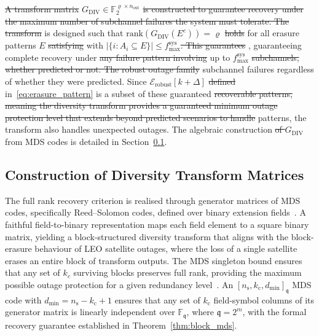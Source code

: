 \documentclass[lettersize,journal]{IEEEtran}
\providecommand{\DIFadd}[1]{{\protect\color{blue}#1}} %
\providecommand{\DIFdel}[1]{{\protect\color{red}\sout{#1}}}                      %
\providecommand{\DIFaddbegin}{} %
\providecommand{\DIFaddend}{} %
\providecommand{\DIFdelbegin}{} %
\providecommand{\DIFdelend}{} %
\newcommand{\DIFscaledelfig}{0.5}
\newlength{\DIFdelgraphicswidth} %
\newlength{\DIFdelgraphicsheight} %
\newcommand{\DIFaddincludegraphics}[2][]{{\color{blue}\fbox{\DIFOincludegraphics[#1]{#2}}}} %
\newcommand{\DIFdelincludegraphics}[2][]{%
\sbox{\DIFdelgraphicsbox}{\DIFOincludegraphics[#1]{#2}}%
\settoboxwidth{\DIFdelgraphicswidth}{\DIFdelgraphicsbox} %
\settoboxtotalheight{\DIFdelgraphicsheight}{\DIFdelgraphicsbox} %
\scalebox{\DIFscaledelfig}{%
\parbox[b]{\DIFdelgraphicswidth}{\usebox{\DIFdelgraphicsbox}\\[-\baselineskip] \rule{\DIFdelgraphicswidth}{0em}}\llap{\resizebox{\DIFdelgraphicswidth}{\DIFdelgraphicsheight}{%
\setlength{\unitlength}{\DIFdelgraphicswidth}%
\begin{picture}(1,1)%
\thicklines\linethickness{2pt} %
{\color[rgb]{1,0,0}\put(0,0){\framebox(1,1){}}}%
{\color[rgb]{1,0,0}\put(0,0){\line( 1,1){1}}}%
{\color[rgb]{1,0,0}\put(0,1){\line(1,-1){1}}}%
\end{picture}%
}\hspace*{3pt}}} %
} %
\DeclareRobustCommand{\DIFaddbegin}{\DIFOaddbegin \let\includegraphics\DIFaddincludegraphics} %
\DeclareRobustCommand{\DIFaddend}{\DIFOaddend \let\includegraphics\DIFOincludegraphics} %
\DeclareRobustCommand{\DIFdelbegin}{\DIFOdelbegin \let\includegraphics\DIFdelincludegraphics} %
\DeclareRobustCommand{\DIFdelend}{\DIFOaddend \let\includegraphics\DIFOincludegraphics} %
\begin{document}
\DIFdelbegin \DIFdel{A transform matrix }\DIFdelend \DIFaddbegin {\color{blue}\DIFadd{The transform }\DIFaddend $G_{\mathrm{DIV}} \in \mathbb{F}_2^{\varrho \times n_{\text{out}}}$ \DIFdelbegin \DIFdel{is constructed to guarantee recovery under the maximum number of subchannel failures the system must tolerate. The transform }\DIFdelend is designed such that
$\mathrm{rank}\!\left(G_{\mathrm{DIV}}(E^{c})\right)=\varrho$
\DIFdelbegin \DIFdel{holds }\DIFdelend for all erasure patterns $E$ \DIFdelbegin \DIFdel{satisfying 
}\DIFdelend \DIFaddbegin \DIFadd{with
}\DIFaddend $|\{i : A_i \subseteq E\}| \leq f_{\mathrm{max}}^{\mathrm{sys}}$\DIFdelbegin \DIFdel{.
This guarantees }\DIFdelend \DIFaddbegin \DIFadd{,
guaranteeing }\DIFaddend complete recovery under \DIFdelbegin \DIFdel{any failure pattern involving 
}\DIFdelend up to $f_{\mathrm{max}}^{\mathrm{sys}}$ \DIFdelbegin \DIFdel{subchannels, whether predicted 
or not. The robust outage family }\DIFdelend \DIFaddbegin \DIFadd{subchannel failures regardless of whether they were predicted. Since }\DIFaddend $\mathcal{E}_{\mathrm{robust}}[k+\Delta]$ \DIFdelbegin \DIFdel{defined }\DIFdelend in~\eqref{eq:erasure_pattern} is a subset of these guaranteed \DIFdelbegin \DIFdel{recoverable patterns, meaning the diversity transform provides a 
guaranteed minimum outage protection level that extends beyond predicted scenarios to handle }\DIFdelend \DIFaddbegin \DIFadd{patterns, the transform also handles }\DIFaddend unexpected outages. The algebraic construction \DIFdelbegin \DIFdel{of 
$G_{\mathrm{DIV}}$ }\DIFdelend from MDS codes is detailed in Section~\ref{sec:diversity_transform_construction}.\DIFaddbegin }
\DIFaddend \subsection{Construction of Diversity Transform Matrices}
\label{sec:diversity_transform_construction}
The full rank recovery criterion is realised through generator 
matrices of MDS codes, specifically 
Reed--Solomon codes, defined over binary extension 
fields~\cite{Seroussi1986}. A faithful field-to-binary representation 
maps each field element to a square binary matrix, yielding a 
block-structured diversity transform that aligns with the 
block-erasure behaviour of LEO satellite outages, where the loss of 
a single satellite erases an entire block of transform outputs. The 
MDS singleton bound ensures that any set of $k_c$ surviving blocks preserves full rank, providing the maximum possible outage protection for a given redundancy level~\cite{Roth2006,HuffmanPless2003}. An 
$[n_{\mathrm{s}},k_{\mathrm{c}},d_{\min}]_{\mathfrak{q}}$ MDS code 
with $d_{\min} = n_{\mathrm{s}}-k_{\mathrm{c}}+1$ ensures that any 
set of $k_{\mathrm{c}}$ field-symbol columns of its generator matrix 
is linearly independent over $\mathbb{F}_{\mathfrak{q}}$, where 
$\mathfrak{q} = 2^{m}$, with the formal recovery guarantee 
established in Theorem~\ref{thm:block_mds}.
\end{document}
